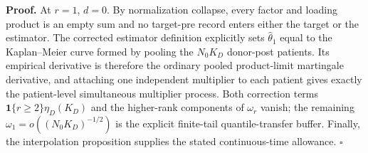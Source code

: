 \textbf{Proof.}
At \(r=1\), \(d=0\).  By normalization collapse, every factor and loading product is an empty sum and no target-pre record enters either the target or the estimator.  The corrected estimator definition explicitly sets \(\widehat\theta_1\) equal to the Kaplan--Meier curve formed by pooling the \(N_0K_D\) donor-post patients.  Its empirical derivative is therefore the ordinary pooled product-limit martingale derivative, and attaching one independent multiplier to each patient gives exactly the patient-level simultaneous multiplier process.  Both correction terms \(\mathbf 1\{r\ge2\}\eta_D(K_D)\) and the higher-rank components of \(\omega_r\) vanish; the remaining \(\omega_1=o((N_0K_D)^{-1/2})\) is the explicit finite-tail quantile-transfer buffer.  Finally, the interpolation proposition supplies the stated continuous-time allowance. \(\square\)